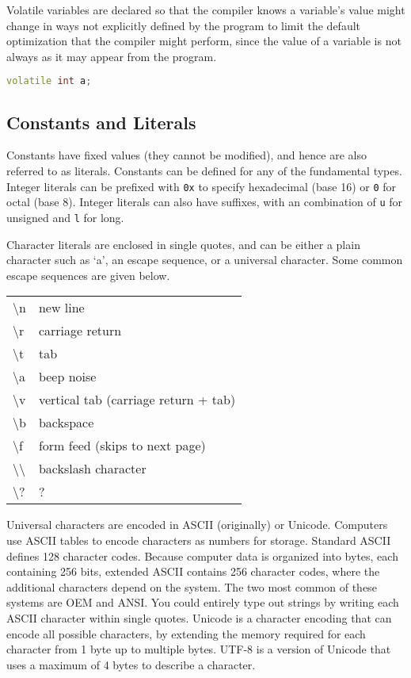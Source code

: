 \documentclass[10pt]{article}
\begin{document}
Volatile variables are declared so that the compiler knows a variable's value might change in ways not explicitly defined by the program to limit the default optimization that the compiler might perform, since the value of a variable is not always as it may appear from the program.

\begin{lstlisting}[language=C++]
volatile int a;
\end{lstlisting}

\subsection{Constants and Literals}

Constants have fixed values (they cannot be modified), and hence are also referred to as literals. Constants can be defined for any of the fundamental types. Integer literals can be prefixed with \texttt{0x} to specify hexadecimal (base 16) or \texttt{0} for octal (base 8). Integer literals can also have suffixes, with an combination of \texttt{u} for unsigned and \texttt{l} for long.

Character literals are enclosed in single quotes, and can be either a plain character such as `a', an escape sequence, or a universal character. Some common escape sequences are given below.

\begin{center}
\begin{tabular}{l l}
\textbackslash n & new line\\
\textbackslash r & carriage return\\
\textbackslash t & tab\\
\textbackslash a & beep noise\\
\textbackslash v & vertical tab (carriage return + tab)\\
\textbackslash b & backspace\\
\textbackslash f & form feed (skips to next page)\\
\textbackslash\textbackslash & backslash character\\
\textbackslash? & ?\\
\end{tabular}
\end{center}

Universal characters are encoded in ASCII (originally) or Unicode. Computers use ASCII tables to encode characters as numbers for storage. Standard ASCII defines 128 character codes. Because computer data is organized into bytes, each containing 256 bits, extended ASCII contains 256 character codes, where the additional characters depend on the system. The two most common of these systems are OEM and ANSI. You could entirely type out strings by writing each ASCII character within single quotes. Unicode is a character encoding that can encode all possible characters, by extending the memory required for each character from 1 byte up to multiple bytes. UTF-8 is a version of Unicode that uses a maximum of 4 bytes to describe a character. 
\end{document}
